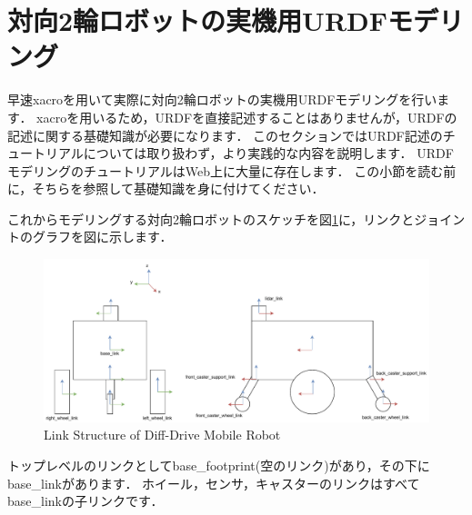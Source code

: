 \documentclass[{../../master}]{subfiles}
\begin{document}
\section{対向2輪ロボットの実機用URDFモデリング}

早速\textsf{xacro}を用いて実際に対向2輪ロボットの実機用URDFモデリングを行います．
\textsf{xacro}を用いるため，URDFを直接記述することはありませんが，URDFの記述に関する基礎知識が必要になります．
このセクションではURDF記述のチュートリアルについては取り扱わず，より実践的な内容を説明します．
URDFモデリングのチュートリアルはWeb上に大量に存在します．
この小節を読む前に，そちらを参照して基礎知識を身に付けてください．

これからモデリングする対向2輪ロボットのスケッチを図\ref{fig:mobile_robot_structure}に，リンクとジョイントのグラフを図に示します．

\begin{figure}[ht]
  \centering
  \includegraphics[width=100truemm, clip]{images/mobile_robot_structure.drawio.pdf}
  \caption{Link Structure of Diff-Drive Mobile Robot}
  \label{fig:mobile_robot_structure}
\end{figure}

トップレベルのリンクとして\textsf{base\_footprint}(空のリンク)があり，その下に\textsf{base\_link}があります．
ホイール，センサ，キャスターのリンクはすべて\textsf{base\_link}の子リンクです．
\end{document}
